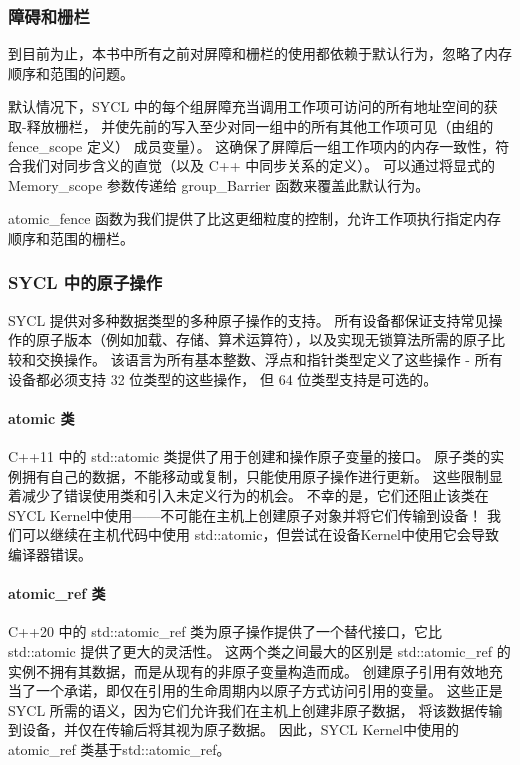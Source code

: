 \subsubsection{障碍和栅栏}
到目前为止，本书中所有之前对屏障和栅栏的使用都依赖于默认行为，忽略了内存顺序和范围的问题。

默认情况下，SYCL 中的每个组屏障充当调用工作项可访问的所有地址空间的获取-释放栅栏，
并使先前的写入至少对同一组中的所有其他工作项可见（由组的 fence\_scope 定义） 成员变量）。 
这确保了屏障后一组工作项内的内存一致性，符合我们对同步含义的直觉（以及 C++ 中同步关系的定义）。 
可以通过将显式的 Memory\_scope 参数传递给 group\_Barrier 函数来覆盖此默认行为。

atomic\_fence 函数为我们提供了比这更细粒度的控制，允许工作项执行指定内存顺序和范围的栅栏。

\subsubsection{SYCL 中的原子操作}
SYCL 提供对多种数据类型的多种原子操作的支持。 
所有设备都保证支持常见操作的原子版本（例如加载、存储、算术运算符），以及实现无锁算法所需的原子比较和交换操作。 
该语言为所有基本整数、浮点和指针类型定义了这些操作 - 所有设备都必须支持 32 位类型的这些操作，
但 64 位类型支持是可选的。

\paragraph{atomic 类}

C++11 中的 std::atomic 类提供了用于创建和操作原子变量的接口。 
原子类的实例拥有自己的数据，不能移动或复制，只能使用原子操作进行更新。 
这些限制显着减少了错误使用类和引入未定义行为的机会。 
不幸的是，它们还阻止该类在 SYCL Kernel中使用——不可能在主机上创建原子对象并将它们传输到设备！ 
我们可以继续在主机代码中使用 std::atomic，但尝试在设备Kernel中使用它会导致编译器错误。

\paragraph{atomic\_ref 类}

C++20 中的 std::atomic\_ref 类为原子操作提供了一个替代接口，它比 std::atomic 提供了更大的灵活性。 
这两个类之间最大的区别是 std::atomic\_ref 的实例不拥有其数据，而是从现有的非原子变量构造而成。 
创建原子引用有效地充当了一个承诺，即仅在引用的生命周期内以原子方式访问引用的变量。 
这些正是 SYCL 所需的语义，因为它们允许我们在主机上创建非原子数据，
将该数据传输到设备，并仅在传输后将其视为原子数据。 
因此，SYCL Kernel中使用的atomic\_ref 类基于std::atomic\_ref。

